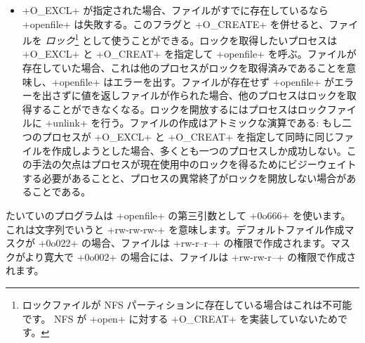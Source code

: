 \begin{itemize}
\item \ml+O_EXCL+ が指定された場合、ファイルがすでに存在しているなら \ml+openfile+ は失敗する。このフラグと \ml+O_CREATE+ を併せると、ファイルを \label{page/lock}\emph{ロック}\footnote{ロックファイルが NFS パーティションに存在している場合はこれは不可能です。 NFS が \ml+open+ に対する \ml+O_CREAT+ を実装していないためです。} として使うことができる。ロックを取得したいプロセスは \ml+O_EXCL+ と \ml+O_CREAT+ を指定して \ml+openfile+ を呼ぶ。ファイルが存在していた場合、これは他のプロセスがロックを取得済みであることを意味し、\ml+openfile+ はエラーを出す。ファイルが存在せず \ml+openfile+ がエラーを出さずに値を返しファイルが作られた場合、他のプロセスはロックを取得することができなくなる。ロックを開放するにはプロセスはロックファイルに \ml+unlink+ を行う。ファイルの作成はアトミックな演算である: もし二つのプロセスが \ml+O_EXCL+ と \ml+O_CREAT+ を指定して同時に同じファイルを作成しようとした場合、多くとも一つのプロセスしか成功しない。この手法の欠点はプロセスが現在使用中のロックを得るためにビジーウェイトする必要があることと、プロセスの異常終了がロックを開放しない場合があることである。
\end{itemize}
\begin{example}
たいていのプログラムは \ml+openfile+ の第三引数として \ml+0o666+ を使います。これは文字列でいうと \ml+rw-rw-rw-+ を意味します。デフォルトファイル作成マスクが \ml+0o022+ の場合、ファイルは \ml+rw-r--r--+ の権限で作成されます。マスクがより寛大で \ml+0o002+ の場合には、ファイルは \ml+rw-rw-r--+ の権限で作成されます。
\enlargethispage{1\baselineskip} %
\enlargethispage{2\medskipamount} %
\end{example}

